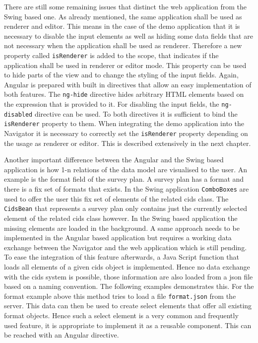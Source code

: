 There are still some remaining issues that distinct the web application from the Swing based one.
As already mentioned, the same application shall be used as renderer and editor.
This means in the case of the demo application that it is necessary to disable the input elements as well as hiding some data fields that are not necessary when the application shall be used as renderer.
Therefore a new property called \texttt{isRenderer} is added to the scope, that indicates if the application shall be used in renderer or editor mode.
This property can be used to hide parts of the view and to change the styling of the input fields.
Again, Angular is prepared with built in directives that allow an easy implementation of both features.
The \texttt{ng-hide} directive hides arbitrary HTML elements based on the expression that is provided to it.
For disabling the input fields, the \texttt{ng-disabled} directive can be used.
To both directives it is sufficient to bind the \texttt{isRenderer} property to them.
When integrating the demo application into the Navigator it is necessary to correctly set the \texttt{isRenderer} property depending on the usage as renderer or editor.
This is described extensively in the next chapter.

Another important difference between the Angular and the Swing based application is how 1-n relations of the data model are visualised to the user.
An example is the format field of the survey plan. A survey plan has a format and there is a fix set of formats that exists. 
In the Swing application \texttt{ComboBoxes} are used to offer the user this fix set of elements of the related cids class.
The \texttt{CidsBean} that represents a survey plan only contains just the currently selected element of the related cids class however.
In the Swing based application the missing elements are loaded in the background.
A same approach needs to be implemented in the Angular based application but requires a working data exchange between the Navigator and the web application which is still pending.
To ease the integration of this feature afterwards, a Java Script function that loads all elements of a given cids object is implemented.
Hence no data exchange with the cids system is possible, those information are also loaded from a json file based on a naming convention.
The following examples demonstrates this.
For the format example above this method tries to load a file \texttt{format.json} from the server.
This data can then be used to create select elements that offer all existing format objects.
Hence such a select element is a very common and frequently used feature, it is appropriate to implement it as a reusable component.
This can be reached with an Angular directive.

